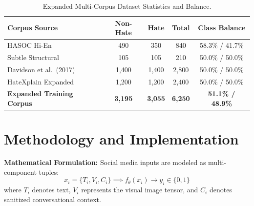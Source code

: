 \documentclass[10pt,twocolumn]{article}
\begin{document}
\begin{table}[h]
\centering
\scriptsize
\begin{tabular}{lcccc}
\toprule
\textbf{Corpus Source} & \textbf{Non-Hate} & \textbf{Hate} & \textbf{Total} & \textbf{Class Balance} \\
\midrule
HASOC Hi-En & 490 & 350 & 840 & 58.3\% / 41.7\% \\
Subtle Structural & 105 & 105 & 210 & 50.0\% / 50.0\% \\
Davidson et al.\ (2017) & 1,400 & 1,400 & 2,800 & 50.0\% / 50.0\% \\
HateXplain Expanded & 1,200 & 1,200 & 2,400 & 50.0\% / 50.0\% \\
\midrule
\textbf{Expanded Training Corpus} & \textbf{3,195} & \textbf{3,055} & \textbf{6,250} & \textbf{51.1\% / 48.9\%} \\
\bottomrule
\end{tabular}
\caption{Expanded Multi-Corpus Dataset Statistics and Balance.}
\end{table}

\section{Methodology and Implementation}
\textbf{Mathematical Formulation:} Social media inputs are modeled as multi-component tuples:
\begin{equation}
    x_i = \{T_i, V_i, C_i\} \implies f_\theta(x_i) \to y_i \in \{0, 1\}
\end{equation}
where $T_i$ denotes text, $V_i$ represents the visual image tensor, and $C_i$ denotes sanitized conversational context.
\end{document}
